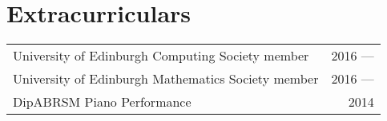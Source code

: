 \documentclass[11pt,a4paper]{article}
\begin{document}
\hline
\section*{Extracurriculars}
\begin{tabularx}{\textwidth}{X r}
    University of Edinburgh Computing Society member & 2016 --- \\
    University of Edinburgh Mathematics Society member & 2016 ---\\
    DipABRSM Piano Performance & 2014
\end{tabularx}
\end{document}
